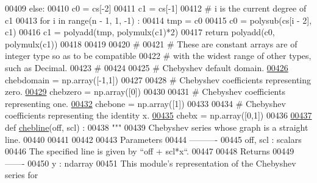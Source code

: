 \begin{DoxyCode}
00409     \textcolor{keywordflow}{else}:
00410         c0 = cs[-2]
00411         c1 = cs[-1]
00412         \textcolor{comment}{# i is the current degree of c1}
00413         \textcolor{keywordflow}{for} i \textcolor{keywordflow}{in} range(n - 1, 1, -1) :
00414             tmp = c0
00415             c0 = polysub(cs[i - 2], c1)
00416             c1 = polyadd(tmp, polymulx(c1)*2)
00417         \textcolor{keywordflow}{return} polyadd(c0, polymulx(c1))
00418 
00419 
00420 \textcolor{comment}{#}
00421 \textcolor{comment}{# These are constant arrays are of integer type so as to be compatible}
00422 \textcolor{comment}{# with the widest range of other types, such as Decimal.}
00423 \textcolor{comment}{#}
00424 
00425 \textcolor{comment}{# Chebyshev default domain.}
\hypertarget{chebyshev_8py_source_l00426}{}\hyperlink{namespacepyneb_1_1utils_1_1chebyshev_a57e110567544748d0de429d3743d1241}{00426} chebdomain = np.array([-1,1])
00427 
00428 \textcolor{comment}{# Chebyshev coefficients representing zero.}
\hypertarget{chebyshev_8py_source_l00429}{}\hyperlink{namespacepyneb_1_1utils_1_1chebyshev_ad707fa9ec865920c2d8eedf6dfedf21c}{00429} chebzero = np.array([0])
00430 
00431 \textcolor{comment}{# Chebyshev coefficients representing one.}
\hypertarget{chebyshev_8py_source_l00432}{}\hyperlink{namespacepyneb_1_1utils_1_1chebyshev_a26a6cedd505a161858435461e1645503}{00432} chebone = np.array([1])
00433 
00434 \textcolor{comment}{# Chebyshev coefficients representing the identity x.}
\hypertarget{chebyshev_8py_source_l00435}{}\hyperlink{namespacepyneb_1_1utils_1_1chebyshev_a00f984b78341cd7920c46d1a6acacc5f}{00435} chebx = np.array([0,1])
00436 
\hypertarget{chebyshev_8py_source_l00437}{}\hyperlink{namespacepyneb_1_1utils_1_1chebyshev_ad14ae6340a5a9e3c93c1bb720f4e5a04}{00437} \textcolor{keyword}{def }\hyperlink{namespacepyneb_1_1utils_1_1chebyshev_ad14ae6340a5a9e3c93c1bb720f4e5a04}{chebline}(off, scl) :
00438     \textcolor{stringliteral}{"""}
00439 \textcolor{stringliteral}{    Chebyshev series whose graph is a straight line.}
00440 \textcolor{stringliteral}{}
00441 \textcolor{stringliteral}{}
00442 \textcolor{stringliteral}{}
00443 \textcolor{stringliteral}{    Parameters}
00444 \textcolor{stringliteral}{    ----------}
00445 \textcolor{stringliteral}{    off, scl : scalars}
00446 \textcolor{stringliteral}{        The specified line is given by ``off + scl*x``.}
00447 \textcolor{stringliteral}{}
00448 \textcolor{stringliteral}{    Returns}
00449 \textcolor{stringliteral}{    -------}
00450 \textcolor{stringliteral}{    y : ndarray}
00451 \textcolor{stringliteral}{        This module's representation of the Chebyshev series for}

\end{DoxyCode}
